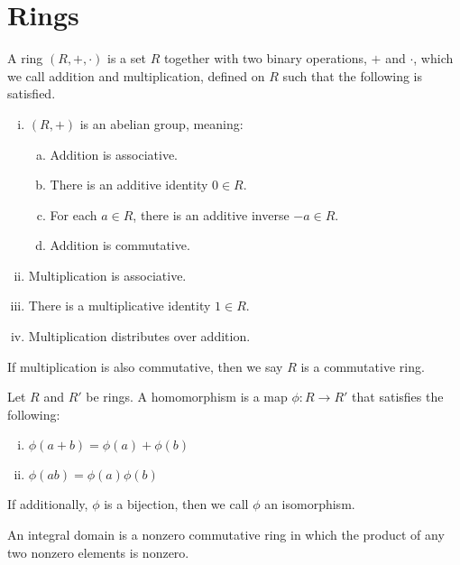 \section{Rings}

\begin{defn}
  A ring $(R, +, \cdot)$ is a set $R$ together with two binary operations, $+$
  and $\cdot$, which we call addition and multiplication, defined on $R$ such
  that the following is satisfied.
  
  \begin{enumerate}[(i)]
    \item $(R,+)$ is an abelian group, meaning:
    \begin{enumerate}[(a)]
      \item Addition is associative.
      \item There is an additive identity $0 \in R$.
      \item For each $a \in R$, there is an additive inverse $-a \in R$.
      \item Addition is commutative.
    \end{enumerate}
    
    \item Multiplication is associative. 
    \item There is a multiplicative identity $1 \in R$.
    \item Multiplication distributes over addition.
  \end{enumerate}
  
  If multiplication is also commutative, then we say $R$ is a commutative ring.
\end{defn}


\begin{defn}[Subring]
\end{defn}


\begin{defn}
  Let $R$ and $R'$ be rings. A homomorphism is a map $\phi: R \rightarrow R'$
  that satisfies the following:
  \begin{enumerate}[(i)]
    \item $\phi(a+b) = \phi(a) + \phi(b)$
    \item $\phi(ab) = \phi(a) \phi(b)$
  \end{enumerate}
  
  If additionally, $\phi$ is a bijection, then we call $\phi$ an isomorphism.
\end{defn}

\begin{defn}
  An integral domain is a nonzero commutative ring in which the product of any
  two nonzero elements is nonzero.
\end{defn}


